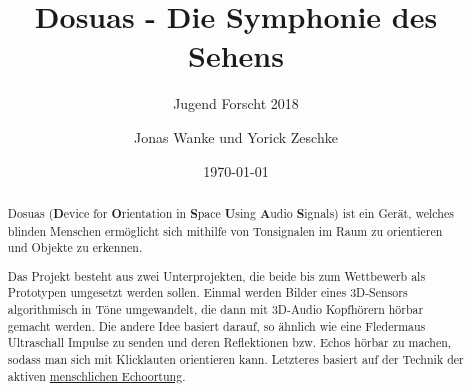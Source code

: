 \documentclass[a4paper,10pt,ngerman]{scrartcl}
\title{Dosuas - Die Symphonie des Sehens}
\subtitle{Jugend Forscht 2018}
\author{Jonas Wanke und Yorick Zeschke}
\date{\today}
\begin{document}
\maketitle

\begin{abstract}
Dosuas (\textbf{D}evice for \textbf{O}rientation in \textbf{S}pace \textbf{U}sing 
\textbf{A}udio \textbf{S}ignals) ist ein Gerät, welches blinden Menschen ermöglicht
sich mithilfe von Tonsignalen im Raum zu orientieren und Objekte zu erkennen.\par
Das Projekt besteht aus zwei Unterprojekten, die beide bis zum 
Wettbewerb als Prototypen umgesetzt werden sollen. Einmal werden Bilder eines 3D-Sensors 
algorithmisch in Töne umgewandelt, die dann mit 3D-Audio Kopfhörern hörbar gemacht
werden. Die andere Idee basiert darauf, so ähnlich wie eine Fledermaus Ultraschall 
Impulse zu senden und deren Reflektionen bzw. Echos hörbar zu machen, sodass man
sich mit Klicklauten orientieren kann. Letzteres basiert auf der Technik der aktiven
\href{https://de.wikipedia.org/wiki/Menschliche_Echoortung}{menschlichen Echoortung}.
\end{abstract}

\tableofcontents
\end{document}
